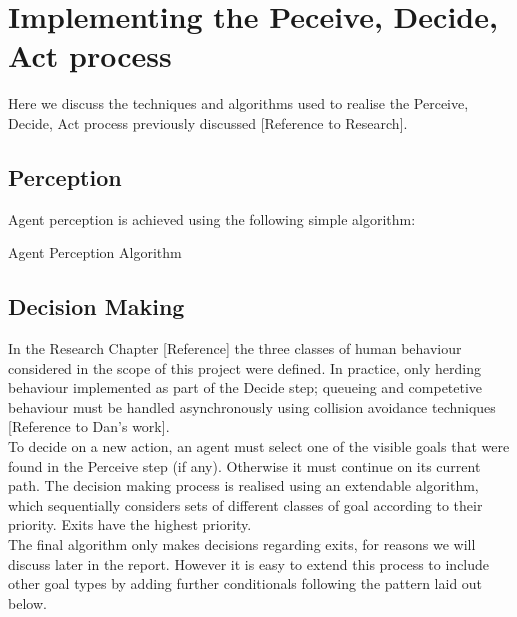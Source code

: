 \documentclass{article}
\begin{document}
\section{Implementing the Peceive, Decide, Act process}
Here we discuss the techniques and algorithms used to realise the Perceive, Decide, Act process previously discussed [Reference to Research].

\subsection{Perception}
Agent perception is achieved using the following simple algorithm:

\begin{algorithm}[H] %
 \SetAlgoLined
 \BlankLine
  \caption{Agent Perception Algorithm}
\end{algorithm}

\subsection{Decision Making}
In the Research Chapter [Reference] the three classes of human behaviour considered in the scope of this project were defined. In practice, only herding behaviour implemented as part of the Decide step; queueing and competetive behaviour must be handled asynchronously using collision avoidance techniques [Reference to Dan's work].\\
To decide on a new action, an agent must select one of the visible goals that were found in the Perceive step (if any). Otherwise it must continue on its current path. The decision making process is realised using an extendable algorithm, which sequentially considers sets of different classes of goal according to their priority. Exits have the highest priority.\\

The final algorithm only makes decisions regarding exits, for reasons we will discuss later in the report. However it is easy to extend this process to include other goal types by adding further conditionals following the pattern laid out below.\\
\end{document}
